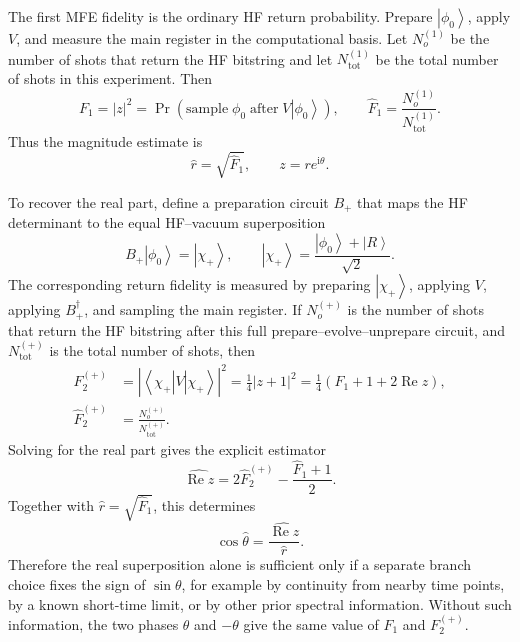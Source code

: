 \documentclass[11pt]{article}
\newcommand{\ii}{\mathrm{i}}
\newcommand{\ket}[1]{\left|#1\right\rangle}
\newcommand{\bra}[1]{\left\langle#1\right|}
\begin{document}
The first MFE fidelity is the ordinary HF return probability.  Prepare $\ket{\phi_0}$, apply $V$, and measure the main register in the computational basis.  Let $N_o^{(1)}$ be the number of shots that return the HF bitstring and let $N_{\mathrm{tot}}^{(1)}$ be the total number of shots in this experiment.  Then
\begin{equation}
    F_1=|z|^2
    = \Pr(\mathrm{sample}\;\phi_0\;\mathrm{after}\;V\ket{\phi_0}),
    \qquad
    \widehat{F}_1=\frac{N_o^{(1)}}{N_{\mathrm{tot}}^{(1)}}.
    \label{eq:mfe_f1_counts}
\end{equation}
Thus the magnitude estimate is
\begin{equation}
    \widehat{r}=\sqrt{\widehat{F}_1},
    \qquad z=re^{\ii\theta}.
\end{equation}

To recover the real part, define a preparation circuit $B_+$ that maps the HF determinant to the equal HF--vacuum superposition
\begin{equation}
    B_+\ket{\phi_0}=\ket{\chi_+},
    \qquad
    \ket{\chi_+}=\frac{\ket{\phi_0}+\ket{R}}{\sqrt{2}}.
\end{equation}
The corresponding return fidelity is measured by preparing $\ket{\chi_+}$, applying $V$, applying $B_+^\dagger$, and sampling the main register.  If $N_o^{(+)}$ is the number of shots that return the HF bitstring after this full prepare--evolve--unprepare circuit, and $N_{\mathrm{tot}}^{(+)}$ is the total number of shots, then
\begin{align}
    F_2^{(+)}
    &= \left|\bra{\chi_+}V\ket{\chi_+}\right|^2
     = \frac{1}{4}|z+1|^2
     = \frac{1}{4}\left(F_1+1+2\operatorname{Re}z\right), \\
    \widehat{F}_2^{(+)}
    &= \frac{N_o^{(+)}}{N_{\mathrm{tot}}^{(+)}}.
    \label{eq:mfe_f2_plus_counts}
\end{align}
Solving for the real part gives the explicit estimator
\begin{equation}
    \widehat{\operatorname{Re}z}
    = 2\widehat{F}_2^{(+)}-\frac{\widehat{F}_1+1}{2}.
    \label{eq:mfe_real_counts}
\end{equation}
Together with $\widehat{r}=\sqrt{\widehat{F}_1}$, this determines
\begin{equation}
    \cos\widehat{\theta}
    = \frac{\widehat{\operatorname{Re}z}}{\widehat{r}}.
\end{equation}
Therefore the real superposition alone is sufficient only if a separate branch choice fixes the sign of $\sin\theta$, for example by continuity from nearby time points, by a known short-time limit, or by other prior spectral information.  Without such information, the two phases $\theta$ and $-\theta$ give the same value of $F_1$ and $F_2^{(+)}$.
\end{document}
